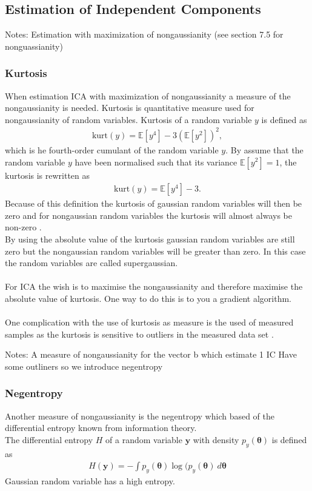 \subsection{Estimation of Independent Components}
Notes:
Estimation with maximization of nongaussianity (see section 7.5 for nonguassianity)


\subsubsection{Kurtosis}
When estimation ICA with maximization of nongaussianity a measure of the nongaussianity is needed. Kurtosis is quantitative measure used for nongaussianity of random variables. Kurtosis of a random variable $y$ is defined as
\begin{align*}
\text{kurt} (y) = \mathbb{E}[y^4] - 3 ( \mathbb{E}[y^2])^2,
\end{align*}
which is he fourth-order cumulant of the random variable $y$. By assume that the random variable $y$ have been normalised such that its variance $\mathbb{E}[y^2] = 1$, the kurtosis is rewritten as
\begin{align*}
\text{kurt} (y) = \mathbb{E}[y^4] - 3.
\end{align*}
Because of this definition the kurtosis of gaussian random variables will then be zero and for nongaussian random variables the kurtosis will almost always be non-zero \cite[p. 171]{ICA}.
\\
By using the absolute value of the kurtosis gaussian random variables are still zero but the nongaussian random variables will be greater than zero. In this case the random variables are called supergaussian.
\\ \\
For ICA the wish is to maximise the nongaussianity and therefore maximise the absolute value of kurtosis. One way to do this is to you a gradient algorithm.
\\ \\
One complication with the use of kurtosis as measure is the used of measured samples as the kurtosis is sensitive to outliers in the measured data set \cite[p. 182]{ICA}. 

Notes:
A measure of nongaussianity for the vector b which estimate 1 IC
Have some outliners so we introduce negentropy

\subsubsection{Negentropy}
Another measure of nongaussianity is the negentropy which based of the differential entropy known from information theory.
\\
The differential entropy $H$ of a random variable $\mathbf{y}$ with density $p_y (\boldsymbol{\theta})$ is defined as
\begin{align*}
H(\mathbf{y}) = - \int p_y (\boldsymbol{\theta}) \log (p_y (\boldsymbol{\theta}) \ d\boldsymbol{\theta}
\end{align*}
Gaussian random variable has a high entropy.


